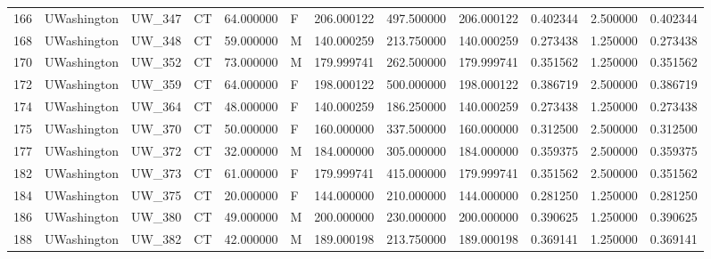 \begin{tabular}{llllrlrrrrrr}
166    &     UWashington &       UW\_347 &                 CT &  64.000000 &        F &       206.000122 &    497.500000 &  206.000122 &               0.402344 &            2.500000 &          0.402344 \\
168    &     UWashington &       UW\_348 &                 CT &  59.000000 &        M &       140.000259 &    213.750000 &  140.000259 &               0.273438 &            1.250000 &          0.273438 \\
170    &     UWashington &       UW\_352 &                 CT &  73.000000 &        M &       179.999741 &    262.500000 &  179.999741 &               0.351562 &            1.250000 &          0.351562 \\
172    &     UWashington &       UW\_359 &                 CT &  64.000000 &        F &       198.000122 &    500.000000 &  198.000122 &               0.386719 &            2.500000 &          0.386719 \\
174    &     UWashington &       UW\_364 &                 CT &  48.000000 &        F &       140.000259 &    186.250000 &  140.000259 &               0.273438 &            1.250000 &          0.273438 \\
175    &     UWashington &       UW\_370 &                 CT &  50.000000 &        F &       160.000000 &    337.500000 &  160.000000 &               0.312500 &            2.500000 &          0.312500 \\
177    &     UWashington &       UW\_372 &                 CT &  32.000000 &        M &       184.000000 &    305.000000 &  184.000000 &               0.359375 &            2.500000 &          0.359375 \\
182    &     UWashington &       UW\_373 &                 CT &  61.000000 &        F &       179.999741 &    415.000000 &  179.999741 &               0.351562 &            2.500000 &          0.351562 \\
184    &     UWashington &       UW\_375 &                 CT &  20.000000 &        F &       144.000000 &    210.000000 &  144.000000 &               0.281250 &            1.250000 &          0.281250 \\
186    &     UWashington &       UW\_380 &                 CT &  49.000000 &        M &       200.000000 &    230.000000 &  200.000000 &               0.390625 &            1.250000 &          0.390625 \\
188    &     UWashington &       UW\_382 &                 CT &  42.000000 &        M &       189.000198 &    213.750000 &  189.000198 &               0.369141 &            1.250000 &          0.369141 \\

\end{tabular}
